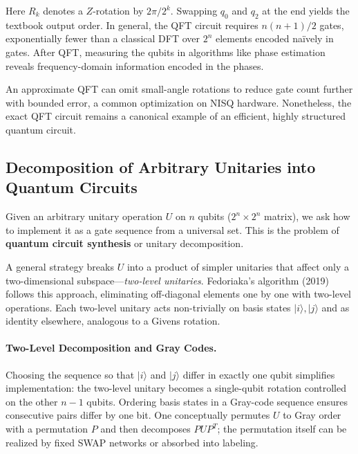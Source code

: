 Here $R_k$ denotes a $Z$-rotation by $2\pi/2^{k}$.\cite{NielsenChuang2010} Swapping $q_0$ and $q_2$ at the end yields the textbook output order.\cite{Cleve1998qft} In general, the QFT circuit requires $n(n+1)/2$ gates, exponentially fewer than a classical DFT over $2^{n}$ elements encoded naïvely in gates.\cite{NielsenChuang2010} After QFT, measuring the qubits in algorithms like phase estimation reveals frequency-domain information encoded in the phases.\cite{Kitaev1995phase}

An approximate QFT can omit small-angle rotations to reduce gate count further with bounded error, a common optimization on NISQ hardware.\cite{Barenco1996approxqft} Nonetheless, the exact QFT circuit remains a canonical example of an efficient, highly structured quantum circuit.\cite{Shor1994}

\subsection{Decomposition of Arbitrary Unitaries into Quantum Circuits}

Given an arbitrary unitary operation $U$ on $n$ qubits ($2^{n}\!\times\!2^{n}$ matrix), we ask how to implement it as a gate sequence from a universal set.\cite{Shende2006synthesis} This is the problem of \textbf{quantum circuit synthesis} or unitary decomposition.

A general strategy breaks $U$ into a product of simpler unitaries that affect only a two-dimensional subspace—\emph{two-level unitaries}.\cite{Reck1994optics} Fedoriaka’s algorithm (2019) follows this approach, eliminating off-diagonal elements one by one with two-level operations.\cite{fedoriaka2025decomposition} Each two-level unitary acts non-trivially on basis states $|i\rangle,|j\rangle$ and as identity elsewhere, analogous to a Givens rotation.\cite{Reck1994optics}

\paragraph{Two-Level Decomposition and Gray Codes.}  
Choosing the sequence so that $|i\rangle$ and $|j\rangle$ differ in exactly one qubit simplifies implementation: the two-level unitary becomes a single-qubit rotation controlled on the other $n\!-\!1$ qubits.\cite{Barenco1995elementary} Ordering basis states in a Gray-code sequence ensures consecutive pairs differ by one bit.\cite{Bullock2004gray} One conceptually permutes $U$ to Gray order with a permutation $P$ and then decomposes $PUP^T$; the permutation itself can be realized by fixed SWAP networks or absorbed into labeling.\cite{Bullock2004gray}

